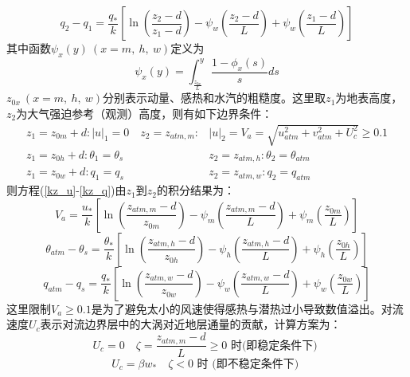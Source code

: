 \begin{equation}
q_{2}-q_{1}=\frac{q_{*}}{k}\left[\ln \left(\frac{z_{2}-d}{z_{1}-d}\right)-\psi_{w}\left(\frac{z_{2}-d}{L}\right)+\psi_{w}\left(\frac{z_{1}-d}{L}\right)\right]
\end{equation}
其中函数$\psi_x\left(y\right)\ (x=m,\ h,\ w)$定义为
\begin{equation}
\psi_{x}(y)=\int_{\frac{z_{0 x}}{L}}^{y} \frac{1-\phi_{x}(s)}{s} d s
\end{equation}
$z_{0x}\ (x=m,\ h,\ w)$分别表示动量、感热和水汽的粗糙度。这里取$z_1$为地表高度，$z_2$为大气强迫参考（观测）高度，则有如下边界条件：
\begin{equation}
\begin{array}{cl}z_{1}=z_{0 m}+d:|u|_{1}=0 \quad z_{2}=z_{atm, m}: & |u|_{2}=V_{a}=\sqrt{u_{atm}^{2}+v_{atm}^{2}+U_{c}^{2}} \geq 0.1 \\ 
     z_{1}=z_{0 h}+d: \theta_{1}=\theta_{s} & z_{2}=z_{atm, h}: \theta_{2}=\theta_{atm} \\ 
     z_{1}=z_{0 w}+d: q_{1}=q_{s} & z_{2}=z_{atm, w}: q_{2}=q_{atm}\end{array}
\end{equation}
则方程(\ref{kz_u}-\ref{kz_q})由$z_1$到$z_2$的积分结果为：
\begin{equation}\label{Va}
V_{a}=\frac{u_{*}}{k}\left[\ln \left(\frac{z_{atm, m}-d}{z_{0 m}}\right)-\psi_{m}\left(\frac{z_{atm, m}-d}{L}\right)+\psi_{m}\left(\frac{z_{0 m}}{L}\right)\right]
\end{equation}
\begin{equation}\label{theta_atm-theta_s}
\theta_{atm}-\theta_{s}=\frac{\theta_{*}}{k}\left[\ln \left(\frac{z_{atm, h}-d}{z_{0 h}}\right)-\psi_{h}\left(\frac{z_{atm, h}-d}{L}\right)+\psi_{h}\left(\frac{z_{0 h}}{L}\right)\right]
\end{equation}
\begin{equation}\label{q_atm-qs}
q_{atm}-q_{s}=\frac{q_{*}}{k}\left[\ln \left(\frac{z_{atm, w}-d}{z_{0 w}}\right)-\psi_{w}\left(\frac{z_{atm, w}-d}{L}\right)+\psi_{w}\left(\frac{z_{0 w}}{L}\right)\right]
\end{equation}
这里限制$V_a\geq0.1$是为了避免太小的风速使得感热与潜热过小导致数值溢出。对流速度$U_c$表示对流边界层中的大涡对近地层通量的贡献，计算方案为：
\begin{equation}
U_{c}=0 \quad \zeta=\frac{z_{atm, m}-d}{L} \geq 0 \text { 时(即稳定条件下) }
\end{equation}
\begin{equation}
U_{c}=\beta w_{*} \quad \zeta<0 \text { 时 (即不稳定条件下) }
\end{equation}

